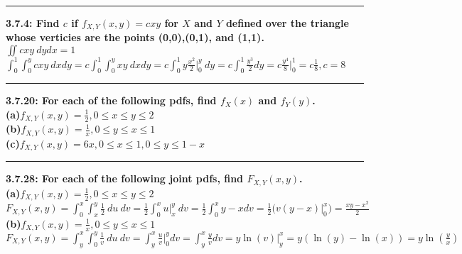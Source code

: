 \documentclass[11pt]{article}
\newcommand\question[2]{\vspace{.25in}\hrule\textbf{#1: #2}\vspace{.5em}\vspace{.10in}}
\renewcommand\part[1]{\vspace{.10in}\textbf{(#1)}}
\begin{document}
\raggedright
\newcommand\NAME{Jonathan Lopez}  %
\newcommand\HWNUM{5}              %



\question{3.7.4}
{Find $c$ if $f_{X,Y}(x,y) = cxy$ for $X$ and $Y$ defined over the triangle whose
verticies are the points (0,0),(0,1), and (1,1).}
\\
$
\iint cxy\ dydx = 1
$
\\
$
\int_{0}^{1} \int_{0}^{y} cxy\ dxdy
=
c \int_{0}^{1} \int_{0}^{y} xy\ dxdy
=
c \int_{0}^{1} y\frac{x^{2}}{2} \big |_{0}^{y} \ dy
=
c \int_{0}^{1} \frac{y^3}{2} dy
=
c \frac{y^4}{8} \big |_{0}^{1}
=
c\frac{1}{8}, c=8
$


\question{3.7.20}
{For each of the following pdfs, find $f_{X}(x)$ and $f_{Y}(y)$.}
\\

\part{a}{$f_{X,Y}(x,y) = \frac{1}{2},0 \leq x \leq y \leq 2$}
\\
\part{b}{$f_{X,Y}(x,y) = \frac{1}{x},0 \leq y \leq x \leq 1$}
\\
\part{c}{$f_{X,Y}(x,y) = 6x,0 \leq x \leq 1,0 \leq y \leq 1-x$}



\question{3.7.28}
{For each of the following joint pdfs, find $F_{X,Y}(x,y)$.}
\\

\part{a}{$f_{X,Y}(x,y) = \frac{1}{2},0 \leq x \leq y \leq 2$}
\\
$
F_{X,Y}(x,y)
=
\int_{0}^{x} \int_{x}^{y} \frac{1}{2} \ du \ dv
=
\frac{1}{2}\int_{0}^{x} u \big |_{x}^{y}\ dv
=
\frac{1}{2}\int_{0}^{x} y-x dv
=
\frac{1}{2} \big ( v(y-x)\big |_{0}^{x} \big )
=
\frac{xy-x^{2}}{2}
$
\\
\part{b}{$f_{X,Y}(x,y) = \frac{1}{x},0 \leq y \leq x \leq 1$}
\\
$
F_{X,Y}(x,y)
=
\int_{y}^{x} \int_{0}^{y} \frac{1}{v} \ du \ dv
=
\int_{y}^{x} \frac{u}{v} \big |_{0}^{y} dv
=
\int_{y}^{x} \frac{y}{v} dv
=
y \ln (v) \big |_{y}^{x}
=
y(\ln (y) - \ln (x))
=
y \ln (\frac{y}{x})
$
\\
\end{document}
